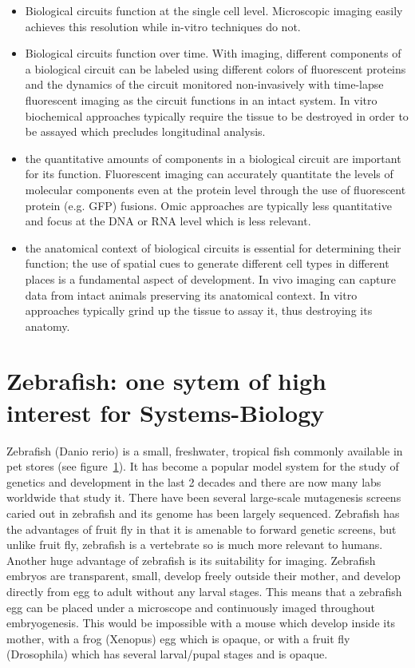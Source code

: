 \begin{itemize}
 \item Biological circuits function at the single cell level. Microscopic
imaging easily achieves this resolution while in-vitro techniques do not.
 \item Biological circuits function over time. With imaging, different
components of a biological circuit can be labeled using different colors of
fluorescent proteins and the dynamics of the circuit monitored non-invasively
with time-lapse fluorescent imaging as the circuit functions in an intact
system. In vitro biochemical approaches typically require the tissue to
be destroyed in order to be assayed which precludes longitudinal analysis.
 \item the quantitative amounts of components in a biological circuit are
important for its function. Fluorescent imaging can accurately quantitate the
levels of molecular components even at the protein level through the use of
fluorescent protein (e.g. GFP) fusions. Omic approaches are typically less
quantitative and focus at the DNA or RNA level which is less relevant.
 \item the anatomical context of biological circuits is essential for
determining their function; the use of spatial cues to generate different cell
types in different places is a fundamental aspect of development. In vivo
imaging can capture data from intact animals preserving its anatomical context.
In vitro approaches typically grind up the tissue to assay it, thus destroying
its anatomy.
\end{itemize}


\section{Zebrafish: one sytem of high interest for Systems-Biology}

Zebrafish (Danio rerio) is a small, freshwater, tropical fish commonly available
in pet stores (see figure~\ref{}). It has become a popular model system for the
study of genetics and development in the last 2 decades and there are now
many labs worldwide that study it. There have been several
large-scale mutagenesis screens caried out in zebrafish and its genome has been
largely sequenced. Zebrafish has the advantages of fruit fly in that it
is amenable to forward genetic screens, but unlike fruit fly, zebrafish is a
vertebrate so is much more relevant to humans. Another huge advantage
of zebrafish is its suitability for imaging. Zebrafish embryos are transparent,
small, develop freely outside their mother, and develop directly from egg to
adult without any larval stages. This means that a zebrafish egg can be placed
under a microscope and continuously imaged throughout embryogenesis. This would
be impossible with a mouse which develop inside its mother, with a frog
(Xenopus) egg which is opaque, or with a fruit fly (Drosophila) which has
several larval/pupal stages and is opaque.

